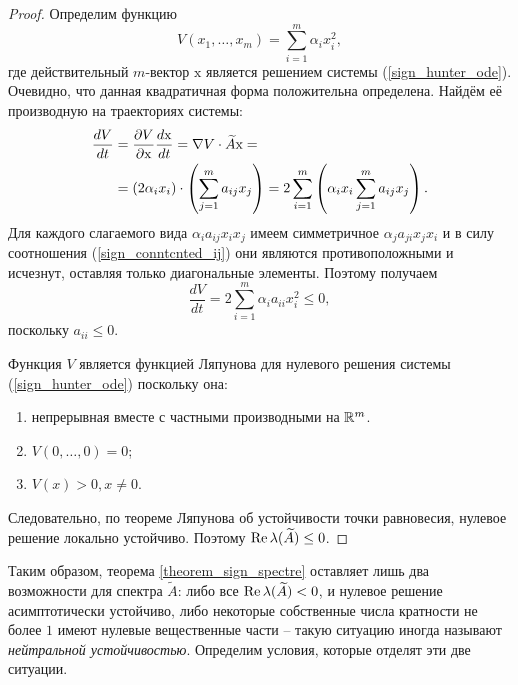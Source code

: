 \begin{proof}
        Определим функцию
        \begin{equation} \label{sign_lyapunov_func}
            V(x_1, \dots, x_m) = \sum_{i=1}^{m} \alpha_i x_i^2,
        \end{equation}
        где действительный \(m\)-вектор \(\mathrm{x}\) является решением системы (\ref{sign_hunter_ode}). Очевидно, что данная квадратичная форма положительна определена. Найдём её производную на траекториях системы:
        \begin{equation}
            \begin{split}
                \frac{dV}{dt} &= \frac{\partial V}{\partial \mathrm{x}} \frac{d \mathrm{x}}{dt} = \nabla V \cdot \widetilde{A} \mathrm{x} =\\ 
                & = \left( 2 \alpha_i x_i \right) \cdot \left( \sum_{j=1}^{m} a_{ij} x_j \right) = 2 \sum_{i=1}^{m} \left( \alpha_i x_i  \sum_{j=1}^{m} a_{ij} x_j \right).
            \end{split}
        \end{equation}
        Для каждого слагаемого вида \(\alpha_i a_{ij} x_i x_j\) имеем симметричное \(\alpha_j a_{ji} x_j x_i\) и в силу соотношения (\ref{sign_conntcnted_ij}) они являются противоположными и исчезнут, оставляя только диагональные элементы. Поэтому получаем
        \begin{equation} \label{sign_lyapunov_func_diag}
            \frac{dV}{dt} = 2 \sum_{i=1}^{m} \alpha_i a_{ii} x_i^2 \leq 0,
        \end{equation}
        поскольку \(a_{ii} \leq 0\).

        Функция \(V\) является функцией Ляпунова для нулевого решения системы (\ref{sign_hunter_ode}) поскольку она:
        \begin{enumerate}
            \item непрерывная вместе с частными производными на \( \mathbb{R}^m \).
            \item \(V(0, \dots, 0) = 0\);
            \item \( V(x) > 0, x\neq 0 \).
        \end{enumerate}
        Следовательно, по теореме Ляпунова об устойчивости точки равновесия, нулевое решение локально устойчиво. Поэтому \(\operatorname{Re} \lambda(\widetilde{A}) \leq 0\).
    \end{proof}

    Таким образом, теорема \ref{theorem_sign_spectre} оставляет лишь два возможности для спектра \(\widetilde{A}\): либо все \(\operatorname{Re} \lambda(\widetilde{A}) < 0\), и нулевое решение асимптотически устойчиво, либо некоторые собственные числа кратности не более \(1\) имеют нулевые вещественные части -- такую ситуацию иногда называют \textit{нейтральной устойчивостью}. Определим условия, которые отделят эти две ситуации.
    
